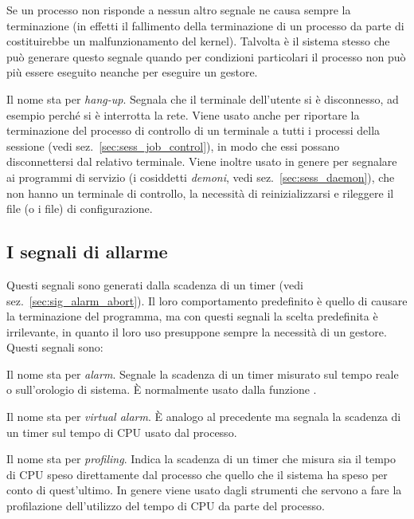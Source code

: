 \begin{basedescript}{\desclabelwidth{2.0cm}}
  Se un processo non risponde a nessun altro segnale  ne causa
  sempre la terminazione (in effetti il fallimento della terminazione di un
  processo da parte di  costituirebbe un malfunzionamento del
  kernel). Talvolta è il sistema stesso che può generare questo segnale quando
  per condizioni particolari il processo non può più essere eseguito neanche
  per eseguire un gestore.

\item[\signald{SIGHUP}] Il nome sta per \textit{hang-up}. Segnala che il
  terminale dell'utente si è disconnesso, ad esempio perché si è interrotta la
  rete. Viene usato anche per riportare la terminazione del processo di
  controllo di un terminale a tutti i processi della sessione (vedi
  sez.~\ref{sec:sess_job_control}), in modo che essi possano disconnettersi
  dal relativo terminale.  Viene inoltre usato in genere per segnalare ai
  programmi di servizio (i cosiddetti \textsl{demoni}, vedi
  sez.~\ref{sec:sess_daemon}), che non hanno un terminale di controllo, la
  necessità di reinizializzarsi e rileggere il file (o i file) di
  configurazione.
\end{basedescript}


\subsection{I segnali di allarme}
\label{sec:sig_alarm}

Questi segnali sono generati dalla scadenza di un timer (vedi
sez.~\ref{sec:sig_alarm_abort}). Il loro comportamento predefinito è quello di
causare la terminazione del programma, ma con questi segnali la scelta
predefinita è irrilevante, in quanto il loro uso presuppone sempre la
necessità di un gestore.  Questi segnali sono:
\begin{basedescript}{\desclabelwidth{2.0cm}}
\item[\signald{SIGALRM}] Il nome sta per \textit{alarm}. Segnale la scadenza di
  un timer misurato sul tempo reale o sull'orologio di sistema. È normalmente
  usato dalla funzione .

\item[\signald{SIVGTALRM}] Il nome sta per \textit{virtual alarm}. È analogo al
  precedente ma segnala la scadenza di un timer sul tempo di CPU usato dal
  processo. 

\item[\signald{SIGPROF}] Il nome sta per \textit{profiling}. Indica la scadenza
  di un timer che misura sia il tempo di CPU speso direttamente dal processo
  che quello che il sistema ha speso per conto di quest'ultimo. In genere
  viene usato dagli strumenti che servono a fare la profilazione dell'utilizzo
  del tempo di CPU da parte del processo.
\end{basedescript}


